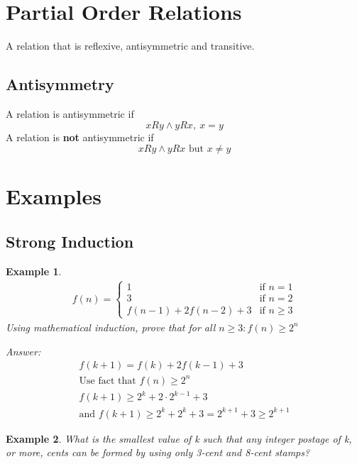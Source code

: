 \documentclass[landscape, letterpaper]{article}
\begin{document}
\begin{multicols}{2}
    \section*{Partial Order Relations}
    A relation that is reflexive, antisymmetric and transitive.
    \subsection*{Antisymmetry}
    A relation is antisymmetric if $$x R y \land y R x,~x = y$$
    A relation is \textbf{not} antisymmetric if $$x R y \land y R x\text{ but }x \neq y$$
    \section*{Examples}
    \newtheorem{example}{Example}
    \subsection*{Strong Induction}
    \begin{example}
        \begin{equation*}
            \begin{aligned}
                f(n) = \begin{cases}
                    1                   & \text{if }n=1      \\
                    3                   & \text{if }n=2      \\
                    f(n-1) + 2f(n-2) +3 & \text{if } n\geq 3
                \end{cases}
            \end{aligned}
        \end{equation*}
        Using mathematical induction, prove that for all $n \geq 3: f(n) \geq 2^n$

        Answer:
        \begin{equation*}
            \begin{aligned}
                f(k+1) =f(k)+ 2f(k-1)+3              \\
                \text{Use fact that $f(n) \geq 2^n$} \\
                f(k+1) \geq 2^k+2\cdot 2^{k-1} +3    \\
                \text{and } f(k+1) \geq 2^k + 2^k +3 = 2^{k+1} + 3 \geq 2^{k+1}
            \end{aligned}
        \end{equation*}
    \end{example}
    \begin{example}
        What is the smallest value of k such that any integer postage of k, or
        more, cents can be formed by using only 3-cent and 8-cent stamps?


\end{example}
\end{multicols}
\end{document}

